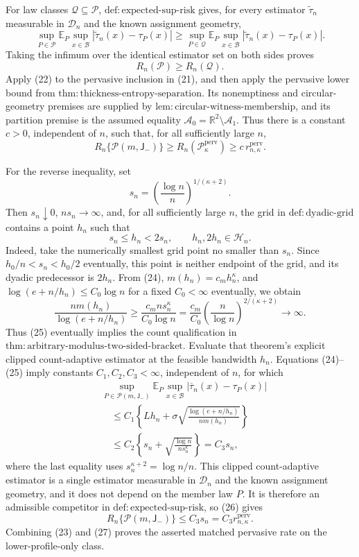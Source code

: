For law classes \(\mathcal Q\subseteq\mathcal P\), \(\mathrm{def:expected\text{-}sup\text{-}risk}\) gives, for every estimator \(\widetilde\tau_n\) measurable in \(\mathcal D_n\) and the known assignment geometry,
\[
 \sup_{P\in\mathcal P}\mathbb E_P\sup_{x\in\mathcal B}
 |\widetilde\tau_n(x)-\tau_P(x)|
 \ge
 \sup_{P\in\mathcal Q}\mathbb E_P\sup_{x\in\mathcal B}
 |\widetilde\tau_n(x)-\tau_P(x)|.
\]
Taking the infimum over the identical estimator set on both sides proves
\[
 R_n(\mathcal P)\ge R_n(\mathcal Q). \tag{22}
\]
Apply (22) to the pervasive inclusion in (21), and then apply the pervasive lower bound from \(\mathrm{thm:thickness\text{-}entropy\text{-}separation}\).  Its nonemptiness and circular-geometry premises are supplied by \(\mathrm{lem:circular\text{-}witness\text{-}membership}\), and its partition premise is the assumed equality \(\mathcal A_0=\mathbb R^2\setminus\mathcal A_1\).  Thus there is a constant \(c>0\), independent of \(n\), such that, for all sufficiently large \(n\),
\[
 R_n\{\mathcal P(m,\mathsf J_{-})\}
 \ge R_n(\mathcal P_\kappa^{\mathrm{perv}})
 \ge c\,r_{n,\kappa}^{\mathrm{perv}}. \tag{23}
\]

For the reverse inequality, set
\[
 s_n=\left(\frac{\log n}{n}\right)^{1/(\kappa+2)}.
\]
Then \(s_n\downarrow0\), \(ns_n\to\infty\), and, for all sufficiently large \(n\), the grid in \(\mathrm{def:dyadic\text{-}grid}\) contains a point \(h_n\) such that
\[
 s_n\le h_n<2s_n,
 \qquad h_n,2h_n\in\mathcal H_n. \tag{24}
\]
Indeed, take the numerically smallest grid point no smaller than \(s_n\).  Since \(h_0/n<s_n<h_0/2\) eventually, this point is neither endpoint of the grid, and its dyadic predecessor is \(2h_n\).  From (24), \(m(h_n)=c_mh_n^\kappa\), and \(\log(e+n/h_n)\le C_0\log n\) for a fixed \(C_0<\infty\) eventually, we obtain
\[
 \frac{nm(h_n)}{\log(e+n/h_n)}
 \ge\frac{c_mns_n^\kappa}{C_0\log n}
 =\frac{c_m}{C_0}
 \left(\frac n{\log n}\right)^{2/(\kappa+2)}
 \longrightarrow\infty. \tag{25}
\]
Thus (25) eventually implies the count qualification in \(\mathrm{thm:arbitrary\text{-}modulus\text{-}two\text{-}sided\text{-}bracket}\).  Evaluate that theorem's explicit clipped count-adaptive estimator at the feasible bandwidth \(h_n\).  Equations (24)--(25) imply constants \(C_1,C_2,C_3<\infty\), independent of \(n\), for which
\[
 \begin{aligned}
 &\sup_{P\in\mathcal P(m,\mathsf J_{-})}
 \mathbb E_P\sup_{x\in\mathcal B}
 |\overline\tau_n(x)-\tau_P(x)|\\
 &\quad\le C_1\left\{Lh_n+
 \sigma\sqrt{\frac{\log(e+n/h_n)}{nm(h_n)}}\right\}\\
 &\quad\le C_2\left\{s_n+
 \sqrt{\frac{\log n}{ns_n^\kappa}}\right\}
 =C_3s_n,
 \end{aligned} \tag{26}
\]
where the last equality uses \(s_n^{\kappa+2}=\log n/n\).  This clipped count-adaptive estimator is a single estimator measurable in \(\mathcal D_n\) and the known assignment geometry, and it does not depend on the member law \(P\).  It is therefore an admissible competitor in \(\mathrm{def:expected\text{-}sup\text{-}risk}\), so (26) gives
\[
 R_n\{\mathcal P(m,\mathsf J_{-})\}
 \le C_3s_n
 =C_3r_{n,\kappa}^{\mathrm{perv}}. \tag{27}
\]
Combining (23) and (27) proves the asserted matched pervasive rate on the lower-profile-only class.

